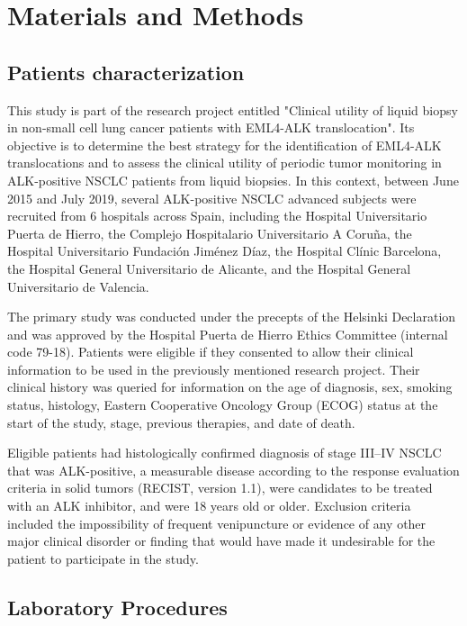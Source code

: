 \chapter{Materials and Methods}

\section{Patients characterization}

This study is part of the research project entitled "Clinical utility of liquid biopsy in non-small cell lung cancer patients with EML4-ALK translocation". Its objective is to determine the best strategy for the identification of EML4-ALK translocations and to assess the clinical utility of periodic tumor monitoring in ALK-positive NSCLC patients from liquid biopsies. In this context, between June 2015 and July 2019, several ALK-positive NSCLC advanced subjects were recruited from 6 hospitals across Spain, including the Hospital Universitario Puerta de Hierro, the Complejo Hospitalario Universitario A Coruña, the Hospital Universitario Fundación Jiménez Díaz, the Hospital Clínic Barcelona, the Hospital General Universitario de Alicante, and the Hospital General Universitario de Valencia.

The primary study was conducted under the precepts of the Helsinki Declaration and was approved by the Hospital Puerta de Hierro Ethics Committee (internal code 79-18). Patients were eligible if they consented to allow their clinical information to be used in the previously mentioned research project. Their clinical history was queried for information on the age of diagnosis, sex, smoking status, histology, Eastern Cooperative Oncology Group (ECOG) status at the start of the study, stage, previous therapies, and date of death.

Eligible patients had histologically confirmed diagnosis of stage III–IV NSCLC that was ALK-positive, a measurable disease according to the response evaluation criteria in solid tumors (RECIST, version 1.1), were candidates to be treated with an ALK inhibitor, and were 18 years old or older. Exclusion criteria included the impossibility of frequent venipuncture or evidence of any other major clinical disorder or finding that would have made it undesirable for the patient to participate in the study.

\section{Laboratory Procedures}


